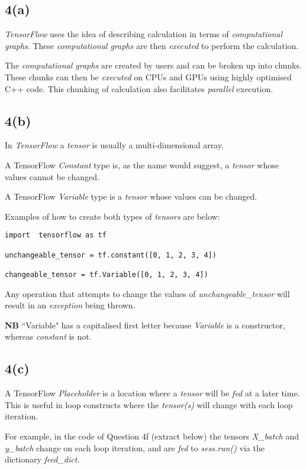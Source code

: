 \documentclass[12pt, a4paper,reqno]{article}
\begin{document}
\subsection*{4(a)}
\emph{TensorFlow} uses the idea of describing calculation in terms of \emph{computational graphs}. These \emph{computational graphs} are then \emph{executed} to perform the calculation. 

The \emph{computational graphs} are created by users and can be broken up into chunks. These chunks can then be \emph{executed} on CPUs and GPUs using highly optimised C++ code. This chunking of calculation also facilitates \emph{parallel} execution. 

\subsection*{4(b)}
In \emph{TensorFlow} a \emph{tensor} is usually a multi-dimensional array.

A TensorFlow \emph{Constant} type is, as the name would suggest, a \emph{tensor} whose values cannot be changed.

A TensorFlow \emph{Variable} type is a \emph{tensor} whose values can be changed.

Examples of how to create both types of \emph{tensors} are below:

\begin{verbatim}
import  tensorflow as tf

unchangeable_tensor = tf.constant([0, 1, 2, 3, 4])

changeable_tensor = tf.Variable([0, 1, 2, 3, 4])
\end{verbatim}

Any operation that attempts to change the values of \emph{unchangeable\_tensor} will result in an \emph{exception} being thrown.

\textbf{NB} ``Variable" has a capitalised first letter because \emph{Variable} is a constructor, whereas \emph{constant} is not.

\subsection*{4(c)}
A TensorFlow \emph{Placeholder} is a location where a \emph{tensor} will be \emph{fed} at a later time. This is useful in loop constructs where the \emph{tensor(s)} will change with each loop iteration.

For example, in the code of Question 4f (extract below) the tensors \emph{X\_batch} and \emph{y\_batch} change on each loop iteration, and are \emph{fed} to \emph{sess.run()} via the dictionary \emph{feed\_dict}.
\end{document}
